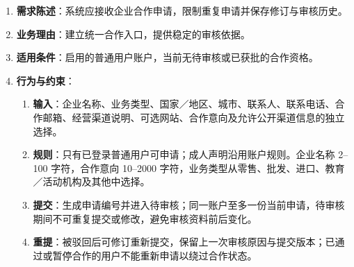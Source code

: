 \begin{enumerate}
\item {\bfseries 需求陈述}：系统应接收企业合作申请，限制重复申请并保存修订与审核历史。
\item {\bfseries 业务理由}：建立统一合作入口，提供稳定的审核依据。
\item {\bfseries 适用条件}：启用的普通用户账户，当前无待审核或已获批的合作资格。
\item {\bfseries 行为与约束}：
\begin{enumerate}
\item {\bfseries 输入}：企业名称、业务类型、国家／地区、城市、联系人、联系电话、合作邮箱、经营渠道说明、可选网站、合作意向及允许公开渠道信息的独立选择。
\item {\bfseries 规则}：只有已登录普通用户可申请；成人声明沿用账户规则。企业名称 2--100 字符，合作意向 10--2000 字符，业务类型从零售、批发、进口、教育／活动机构及其他中选择。
\item {\bfseries 提交}：生成申请编号并进入待审核；同一账户至多一份当前申请，待审核期间不可重复提交或修改，避免审核资料前后变化。
\item {\bfseries 重提}：被驳回后可修订重新提交，保留上一次审核原因与提交版本；已通过或暂停合作的用户不能重新申请以绕过合作状态。
\end{enumerate}

\end{enumerate}


